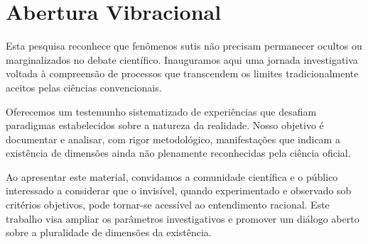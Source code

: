 
\section{Abertura Vibracional}

Esta pesquisa reconhece que fenômenos sutis não precisam permanecer ocultos ou marginalizados no debate científico. Inauguramos aqui uma jornada investigativa voltada à compreensão de processos que transcendem os limites tradicionalmente aceitos pelas ciências convencionais.

Oferecemos um testemunho sistematizado de experiências que desafiam paradigmas estabelecidos sobre a natureza da realidade. Nosso objetivo é documentar e analisar, com rigor metodológico, manifestações que indicam a existência de dimensões ainda não plenamente reconhecidas pela ciência oficial.

Ao apresentar este material, convidamos a comunidade científica e o público interessado a considerar que o invisível, quando experimentado e observado sob critérios objetivos, pode tornar-se acessível ao entendimento racional. Este trabalho visa ampliar os parâmetros investigativos e promover um diálogo aberto sobre a pluralidade de dimensões da existência.
